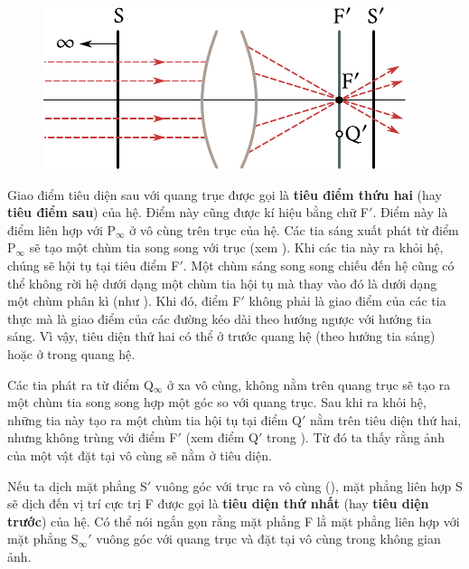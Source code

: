 \begin{figure}[!htb]
	\begin{center}
		\includegraphics[scale=1]{figures/ch_16/fig_16_13.pdf}
        \caption[]{}
		\label{fig:16_13}
	\end{center}
	\vspace{-0.8cm}
\end{figure}

Giao điểm tiêu diện sau với quang trục được gọi là \textbf{tiêu điểm thứu hai} (hay \textbf{tiêu điểm sau}) của hệ.
Điểm này cũng được kí hiệu bằng chữ F$'$.
Điểm này là điểm liên hợp với P$_{\infty}$ ở vô cùng trên trục của hệ.
Các tia sáng xuất phát từ điểm P$_{\infty}$ sẽ tạo một chùm tia song song với trục (xem ).
Khi các tia này ra khỏi hệ, chúng sẽ hội tụ tại tiêu điểm F$'$.
Một chùm sáng song song chiếu đến hệ cũng có thể không rời hệ dưới dạng một chùm tia hội tụ mà thay vào đó là dưới dạng một chùm phân kì (như ).
Khi đó, điểm F$'$ không phải là giao điểm của các tia thực mà là giao điểm của các đường kéo dài theo hướng ngược với hướng tia sáng.
Vì vậy, tiêu diện thứ hai có thể ở trước quang hệ (theo hướng tia sáng) hoặc ở trong quang hệ.

Các tia phát ra từ điểm Q$_{\infty}$ ở xa vô cùng, không nằm trên quang trục sẽ tạo ra một chùm tia song song hợp một góc so với quang trục.
Sau khi ra khỏi hệ, những tia này tạo ra một chùm tia hội tụ tại điểm Q$'$ nằm trên tiêu diện thứ hai, nhưng không trùng với điểm F$'$ (xem điểm Q$'$ trong ).
Từ đó ta thấy rằng ảnh của một vật đặt tại vô cùng sẽ nằm ở tiêu diện.

Nếu ta dịch mặt phẳng S$'$ vuông góc với trục ra vô cùng (), mặt phẳng liên hợp S sẽ dịch đến vị trí cực trị F được gọi là \textbf{tiêu diện thứ nhất} (hay \textbf{tiêu diện trước}) của hệ.
Có thể nói ngắn gọn rằng mặt phẳng F lằ mặt phẳng liên hợp với mặt phẳng S$_{\infty}'$ vuông góc với quang trục và đặt tại vô cùng trong không gian ảnh.

